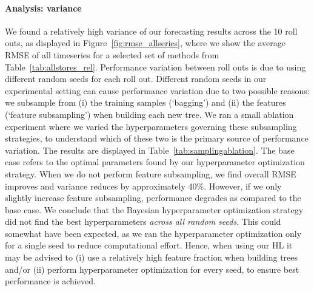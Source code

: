 \documentclass[preprint, 3p, times, twocolumn]{elsarticle}
\begin{document}
  \paragraph{Analysis: variance} We found a relatively high variance of our forecasting results across the 10 roll outs, as displayed in Figure~\ref{fig:rmse_allseries}, where we show the average RMSE of all timeseries for a selected set of methods from Table~\ref{tab:allstores_rel}. Performance variation between roll outs is due to using different random seeds for each roll out. Different random seeds in our experimental setting can cause performance variation due to two possible reasons: we subsample from (i) the training samples (`bagging') and (ii) the features (`feature subsampling') when building each new tree. We ran a small ablation experiment where we varied the hyperparameters governing these subsampling strategies, to understand which of these two is the primary source of performance variation. The results are displayed in Table~\ref{tab:samplingablation}. The base case refers to the optimal parameters found by our hyperparameter optimization strategy. When we do not perform feature subsampling, we find overall RMSE improves and variance reduces by approximately 40\%. However, if we only slightly increase feature subsampling, performance degrades as compared to the base case. We conclude that the Bayesian hyperparameter optimization strategy did not find the best hyperparameters \textit{across all random seeds}. This could somewhat have been expected, as we ran the hyperparameter optimization only for a single seed to reduce computational effort. Hence, when using our HL it may be advised to (i) use a relatively high feature fraction when building trees and/or (ii) perform hyperparameter optimization for every seed, to ensure best performance is achieved.
  
\end{document}

